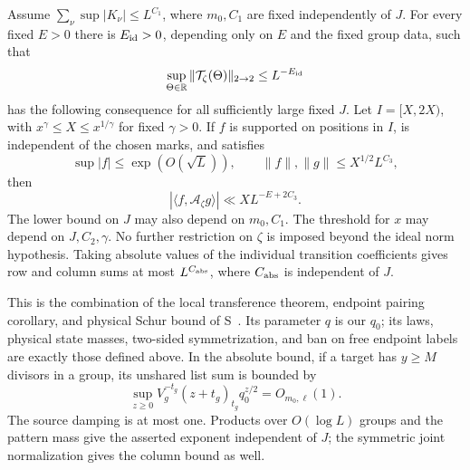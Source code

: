 \begin{proposition}
\label{prop:graph-transfer}
Assume $\sum_\nu\sup|K_\nu|\leq L^{C_1}$, where $m_0,C_1$ are
fixed independently of $J$.  For every fixed $E>0$ there is
$E_{\rm id}>0$, depending only on $E$ and the fixed group data,
such that
\[
 \sup_{\Theta\in\mathbb R}
    \|\mathcal T_\zeta(\Theta)\|_{2\to2}\leq L^{-E_{\rm id}}
\]
has the following consequence for all sufficiently large fixed $J$.
Let $I=[X,2X)$, with $x^\gamma\leq X\leq x^{1/\gamma}$ for fixed
$\gamma>0$.  If $f$ is supported on positions in $I$, is independent
of the chosen marks, and satisfies
\[
 \sup|f|\leq\exp(O(\sqrt L)),\qquad
 \|f\|,\|g\|\leq X^{1/2}L^{C_3},
\]
then
\begin{equation}\label{cor:transferred-pairing}
 |\langle f,\mathcal A_\zeta g\rangle|
       \ll XL^{-E+2C_3}.
\end{equation}
The lower bound on $J$ may also depend on $m_0,C_1$.  The threshold
for $x$ may depend on $J,C_2,\gamma$.  No further restriction on
$\zeta$ is imposed beyond the ideal norm hypothesis.  Taking absolute
values of the individual transition coefficients gives row and column
sums at most $L^{C_{\rm abs}}$, where $C_{\rm abs}$ is independent
of $J$.
\end{proposition}

This is the combination of the local transference theorem, endpoint
pairing corollary, and physical Schur bound of
S~\cite[Theorem~3.5, Corollary~3.11, and Lemma~3.4]{SmoothShifted}.
Its parameter $q$ is our $q_0$; its laws, physical state masses,
two-sided symmetrization, and ban on free endpoint labels are exactly
those defined above. In the absolute bound,
if a target has $y\geq M$ divisors in a group, its unshared list sum
is bounded by
\[
 \sup_{z\geq0}V_g^{-t_g}(z+t_g)_{t_g}q_0^{z/2}=O_{m_0,\ell}(1).
\]
The source damping is at most one.  Products over $O(\log L)$ groups
and the pattern mass give the asserted exponent independent of $J$;
the symmetric joint normalization gives the column bound as well.

